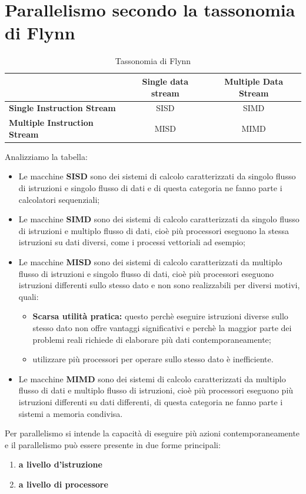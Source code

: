 \documentclass[12pt]{report}
\begin{document}
\section{Parallelismo secondo la tassonomia di Flynn}
\begin{table}[H]
	\centering
	\begin{tabular}{|l|c|c|}
		\hline
		& \textbf{Single data stream} & \textbf{Multiple Data Stream} \\
		\hline
		\textbf{Single Instruction Stream} & SISD & SIMD \\
		\hline
		\textbf{Multiple Instruction Stream} & MISD & MIMD \\
		\hline
	\end{tabular}
	\caption{Tassonomia di Flynn}
	\label{tab:flynn}
\end{table}
Analizziamo la tabella:
\begin{itemize}
	\item Le macchine \textbf{SISD} sono dei sistemi di calcolo caratterizzati da singolo flusso di istruzioni e singolo flusso di dati e di questa categoria ne fanno parte i calcolatori sequenziali;
	\item Le macchine \textbf{SIMD} sono dei sistemi di calcolo caratterizzati da singolo flusso di istruzioni e multiplo flusso di dati, cioè più processori eseguono la stessa istruzioni su dati diversi, come i processi vettoriali ad esempio;
	\item Le macchine \textbf{MISD} sono dei sistemi di calcolo caratterizzati da multiplo flusso di istruzioni e singolo flusso di dati, cioè più processori eseguono istruzioni differenti sullo stesso dato e non sono realizzabili per diversi motivi, quali:
	\begin{itemize}
		\item \textbf{Scarsa utilità pratica:} questo perchè eseguire istruzioni diverse sullo stesso dato non offre vantaggi significativi e perchè la maggior parte dei problemi reali richiede di elaborare più dati contemporaneamente;
		\item utilizzare più processori per operare sullo stesso dato è inefficiente.
	\end{itemize}
	\item Le macchine \textbf{MIMD} sono dei sistemi di calcolo caratterizzati da multiplo flusso di dati e multiplo flusso di istruzioni, cioè più processori eseguono più istruzioni differenti su dati differenti, di questa categoria ne fanno parte i sistemi a memoria condivisa.
\end{itemize}
Per parallelismo si intende la capacità di eseguire più azioni contemporaneamente e il parallelismo può essere presente in due forme principali:
\begin{enumerate}
	\item \textbf{a livello d'istruzione}
	\item \textbf{a livello di processore}
\end{enumerate}
\end{document}
